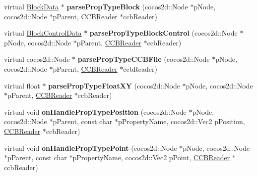\begin{DoxyCompactItemize}
\item 
\mbox{\label{classcocosbuilder_1_1NodeLoader_a85e895b9ad0de457684eb184ce8462d0}} 
virtual \hyperlink{structcocosbuilder_1_1BlockData}{Block\+Data} $\ast$ {\bfseries parse\+Prop\+Type\+Block} (cocos2d\+::\+Node $\ast$p\+Node, cocos2d\+::\+Node $\ast$p\+Parent, \hyperlink{classcocosbuilder_1_1CCBReader}{C\+C\+B\+Reader} $\ast$ccb\+Reader)
\item 
\mbox{\label{classcocosbuilder_1_1NodeLoader_a6bf9d98951f1fb1371ce870fc2bb7665}} 
virtual \hyperlink{structcocosbuilder_1_1BlockControlData}{Block\+Control\+Data} $\ast$ {\bfseries parse\+Prop\+Type\+Block\+Control} (cocos2d\+::\+Node $\ast$p\+Node, cocos2d\+::\+Node $\ast$p\+Parent, \hyperlink{classcocosbuilder_1_1CCBReader}{C\+C\+B\+Reader} $\ast$ccb\+Reader)
\item 
\mbox{\label{classcocosbuilder_1_1NodeLoader_a438427335542afaa53199659d3dd2a1a}} 
virtual cocos2d\+::\+Node $\ast$ {\bfseries parse\+Prop\+Type\+C\+C\+B\+File} (cocos2d\+::\+Node $\ast$p\+Node, cocos2d\+::\+Node $\ast$p\+Parent, \hyperlink{classcocosbuilder_1_1CCBReader}{C\+C\+B\+Reader} $\ast$ccb\+Reader)
\item 
\mbox{\label{classcocosbuilder_1_1NodeLoader_a82f4ee44abdc6a8734b1e6901f63e69c}} 
virtual float $\ast$ {\bfseries parse\+Prop\+Type\+Float\+XY} (cocos2d\+::\+Node $\ast$p\+Node, cocos2d\+::\+Node $\ast$p\+Parent, \hyperlink{classcocosbuilder_1_1CCBReader}{C\+C\+B\+Reader} $\ast$ccb\+Reader)
\item 
\mbox{\label{classcocosbuilder_1_1NodeLoader_ad709cd47b6b373ed7bc08e1d5562c7d6}} 
virtual void {\bfseries on\+Handle\+Prop\+Type\+Position} (cocos2d\+::\+Node $\ast$p\+Node, cocos2d\+::\+Node $\ast$p\+Parent, const char $\ast$p\+Property\+Name, cocos2d\+::\+Vec2 p\+Position, \hyperlink{classcocosbuilder_1_1CCBReader}{C\+C\+B\+Reader} $\ast$ccb\+Reader)
\item 
\mbox{\label{classcocosbuilder_1_1NodeLoader_aa08b42107ac1b3d7d4df2c4b9ff9e881}} 
virtual void {\bfseries on\+Handle\+Prop\+Type\+Point} (cocos2d\+::\+Node $\ast$p\+Node, cocos2d\+::\+Node $\ast$p\+Parent, const char $\ast$p\+Property\+Name, cocos2d\+::\+Vec2 p\+Point, \hyperlink{classcocosbuilder_1_1CCBReader}{C\+C\+B\+Reader} $\ast$ccb\+Reader)

\end{DoxyCompactItemize}
